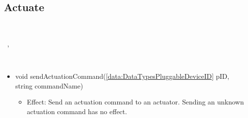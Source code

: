   \subsection{Actuate}\label{int:MoteMoteActuate}
    \begin{description}
      \item[Provided by:] \iconcomponent{}~
      \item[Required by:] \iconcomponent{}~, \iconcomponent{}~
      \item[Operations:] ~
    \begin{itemize}[noitemsep,nolistsep,leftmargin=-.25cm]
      \item \textsf{void sendActuationCommand(\ref{data:DataTypesPluggableDeviceID} pID, string commandName)}
        \begin{itemize}[noitemsep,nolistsep]
           \item Effect: Send an actuation command to an actuator. Sending an unknown actuation command has no effect.
        \end{itemize}
    \end{itemize}
    \end{description}

